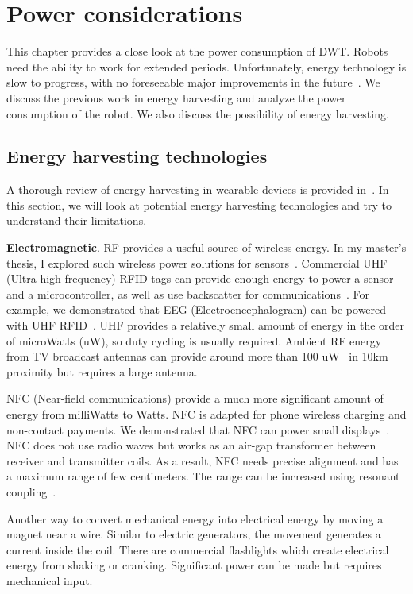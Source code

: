 \chapter{Power considerations}
This chapter provides a close look at the power consumption of DWT. Robots need the ability to work for extended periods. Unfortunately, energy technology is slow to progress, with no foreseeable major improvements in the future~\cite{paradiso2005energy}.  We discuss the previous work in energy harvesting and analyze the power consumption of the robot. We also discuss the possibility of energy harvesting. 

\section{Energy harvesting technologies}
A thorough review of energy harvesting in wearable devices is provided in~\cite{paradiso2005energy}. In this section, we will look at potential energy harvesting technologies and try to understand their limitations. 

\textbf{Electromagnetic}. 
RF provides a useful source of wireless energy. In my master's thesis, I explored such wireless power solutions for sensors~\cite{dementyev2013applications}. Commercial UHF (Ultra high frequency) RFID tags can provide enough energy to power a sensor and a microcontroller, as well as use backscatter for communications~\cite{sample2008design}. For example, we demonstrated that  EEG (Electroencephalogram) can be powered with UHF RFID~\cite{dementyev2013wearable}. UHF provides a relatively small amount of energy in the order of microWatts (uW), so duty cycling is usually required. Ambient RF energy from TV broadcast antennas can provide around more than 100 uW~\cite{parks2013wireless} in 10km proximity but requires a large antenna.

NFC (Near-field communications) provide a much more significant amount of energy from milliWatts to Watts. NFC is adapted for phone wireless charging and non-contact payments. We demonstrated that NFC can power small displays~\cite{dementyev2013wirelessly}. NFC does not use radio waves but works as an air-gap transformer between receiver and transmitter coils. As a result,  NFC needs precise alignment and has a maximum range of few centimeters. The range can be increased using resonant coupling~\cite{sample2011analysis}. 

Another way to convert mechanical energy into electrical energy by moving a magnet near a wire. Similar to electric generators, the movement generates a current inside the coil.  There are commercial flashlights which create electrical energy from shaking or cranking. Significant power can be made but requires mechanical input. 

